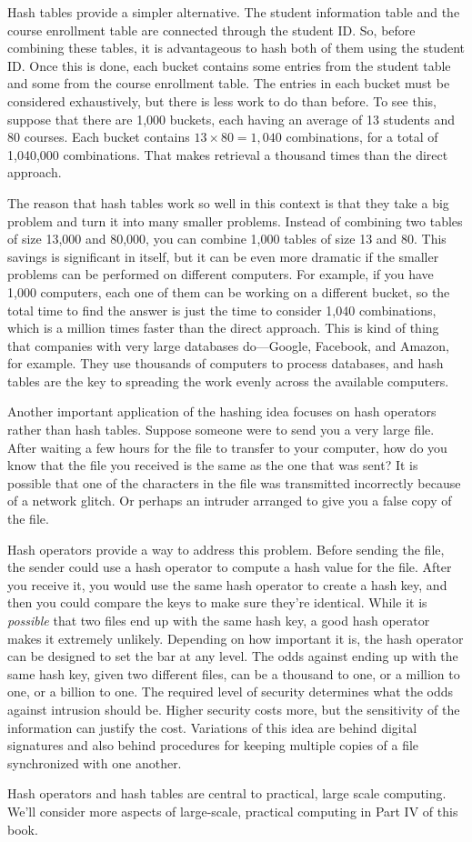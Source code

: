 Hash tables provide a simpler alternative. The student information table
and the course enrollment table are connected through the student ID.
So, before combining these tables, it is advantageous to hash both of them
using the student ID. Once this is done, each bucket contains some entries
from the student table and some from the course enrollment table. The entries
in each bucket must be considered exhaustively, but there is less work to do
than before.
To see this, suppose that there are 1,000 buckets,
each having an average of 13 students and 80 courses. Each bucket
contains $13 \times 80 =1,040$ combinations, 
for a total of 1,040,000 combinations.
That makes retrieval a thousand times than the direct approach.

The reason that hash tables work so well in this context is that they take
a big problem and turn it into many smaller problems. Instead
of combining two tables of size 13,000 and 80,000, you can combine 1,000
tables of size 13 and 80. This savings is significant in itself, but it can
be even more dramatic if the smaller problems can be performed on different
computers. For example, if you have 1,000 computers, each one of them can be
working on a different bucket, so the total time to find the answer is
just the time to consider 1,040 combinations, which is a million times
faster than the direct approach.
This is kind of thing that companies with very large databases do---Google, Facebook, and Amazon, for example. 
They use thousands of computers to process databases, and
hash tables are the key to spreading 
the work evenly across the available computers.

Another important application of the hashing idea focuses on hash operators
rather than hash tables.
Suppose someone were to send you a very large file. 
After waiting a few hours
for the file to transfer to your computer, how do you know that the file
you received is the same as the one that was sent? 
It is possible that one of the characters
in the file was transmitted incorrectly because of a network glitch. 
Or perhaps an intruder arranged to give you a false copy of the file.

Hash operators provide a way to address this problem.
Before sending the file, the sender could use a hash operator to compute a hash
value for the file. After you receive it, you would use the same hash operator
to create a hash key, and then you could compare the keys to make sure
they're identical. While it is \emph{possible} that two files end up with the
same hash key, a good hash operator makes it extremely unlikely.
Depending on how important it is, the hash operator can be designed to set
the bar at any level. The odds against
ending up with the same hash key, given two different files, can be
a thousand to one, or a million to one, or a billion to one. 
The required level of security
determines what the odds against intrusion should be. Higher security
costs more, but the sensitivity of the information can justify the cost.
Variations of this idea are behind digital signatures and 
also behind procedures for
keeping multiple copies of a file synchronized with one another.

Hash operators and hash tables are central to practical, large scale computing.
We'll consider more aspects of large-scale, practical computing
in Part IV of this book.

